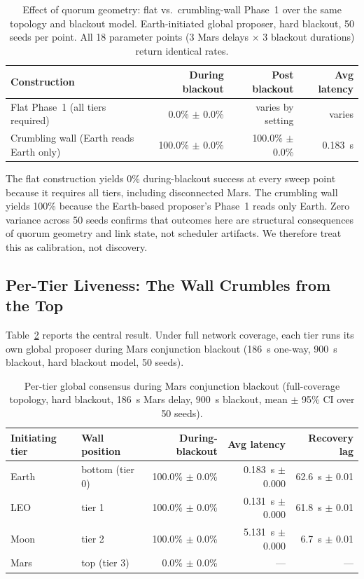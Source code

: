 \documentclass[11pt]{article}
\begin{document}
\begin{table}[t]
\centering
\small
\caption{Effect of quorum geometry: flat vs.\ crumbling-wall Phase~1 over the same topology and blackout model. Earth-initiated global proposer, hard blackout, 50 seeds per point. All 18 parameter points (3 Mars delays $\times$ 3 blackout durations) return identical rates.}
\label{tab:flat-vs-wall}
\begin{tabular}{lrrr}
\toprule
Construction & During blackout & Post blackout & Avg latency \\
\midrule
Flat Phase~1 (all tiers required) & 0.0\% $\pm$ 0.0\% & varies by setting & varies \\
Crumbling wall (Earth reads Earth only) & 100.0\% $\pm$ 0.0\% & 100.0\% $\pm$ 0.0\% & 0.183~s \\
\bottomrule
\end{tabular}
\end{table}

The flat construction yields 0\% during-blackout success at every sweep point because it requires all tiers, including disconnected Mars. The crumbling wall yields 100\% because the Earth-based proposer's Phase~1 reads only Earth. Zero variance across 50 seeds confirms that outcomes here are structural consequences of quorum geometry and link state, not scheduler artifacts. We therefore treat this as calibration, not discovery.

\subsection{Per-Tier Liveness: The Wall Crumbles from the Top}

Table~\ref{tab:pertier} reports the central result. Under full network coverage, each tier runs its own global proposer during Mars conjunction blackout (186~s one-way, 900~s blackout, hard blackout model, 50 seeds).

\begin{table}[t]
\centering
\small
\caption{Per-tier global consensus during Mars conjunction blackout (full-coverage topology, hard blackout, 186~s Mars delay, 900~s blackout, mean $\pm$ 95\% CI over 50 seeds).}
\label{tab:pertier}
\begin{tabular}{llrrr}
\toprule
Initiating tier & Wall position & During-blackout & Avg latency & Recovery lag \\
\midrule
Earth & bottom (tier 0) & 100.0\% $\pm$ 0.0\% & 0.183~s $\pm$ 0.000 & 62.6~s $\pm$ 0.01 \\
LEO & tier 1 & 100.0\% $\pm$ 0.0\% & 0.131~s $\pm$ 0.000 & 61.8~s $\pm$ 0.01 \\
Moon & tier 2 & 100.0\% $\pm$ 0.0\% & 5.131~s $\pm$ 0.000 & 6.7~s $\pm$ 0.01 \\
Mars & top (tier 3) & 0.0\% $\pm$ 0.0\% & --- & --- \\
\bottomrule
\end{tabular}
\end{table}
\end{document}
